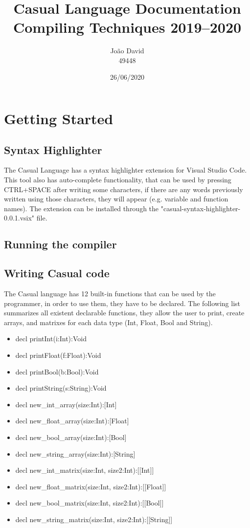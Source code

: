 \documentclass[12pt]{article}
\title{Casual Language Documentation \\
  \Large Compiling Techniques 2019--2020
}
\author{
  João David\\49448
}
\date{26/06/2020}
\begin{document}
\maketitle


\section{Getting Started}
\subsection{Syntax Highlighter}
The Casual Language has a syntax highlighter extension for Visual Studio Code. This tool also has auto-complete functionality, that can be used by pressing CTRL+SPACE after writing some characters, if there are any words previously written using those characters, they will appear (e.g. variable and function names).
The extension can be installed through the "casual-syntax-highlighter-0.0.1.vsix" file.

\subsection{Running the compiler}


\subsection{Writing Casual code}
The Casual language has 12 built-in functions that can be used by the programmer, in order to use them, they have to be declared. The following list summarizes all existent declarable functions, they allow the user to print, create arrays, and matrixes for each data type (Int, Float, Bool and String). \\

\begin{itemize}
		\item decl printInt(i:Int):Void
        \item decl printFloat(f:Float):Void
        \item decl printBool(b:Bool):Void
        \item decl printString(s:String):Void
        \item decl new\_int\_array(size:Int):[Int]
        \item decl new\_float\_array(size:Int):[Float]
        \item decl new\_bool\_array(size:Int):[Bool]
        \item decl new\_string\_array(size:Int):[String]
        \item decl new\_int\_matrix(size:Int, size2:Int):[[Int]]
        \item decl new\_float\_matrix(size:Int, size2:Int):[[Float]]
        \item decl new\_bool\_matrix(size:Int, size2:Int):[[Bool]]
        \item decl new\_string\_matrix(size:Int, size2:Int):[[String]]       

\end{itemize}
\end{document}
